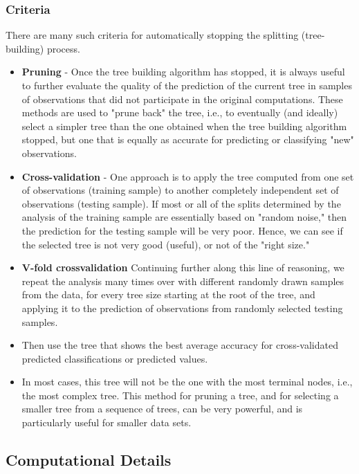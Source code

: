 \documentclass[caret-main.tex]{subfiles}
\begin{document}
\subsubsection*{Criteria}
There are many such criteria for automatically stopping the splitting (tree-building) process.
\begin{itemize}
\item \textbf{Pruning} - Once the tree building algorithm has stopped, it is always useful to further evaluate the quality of the prediction of the current tree in samples of observations that did not participate in the original computations. These methods are used to "prune back" the tree, i.e., to eventually (and ideally) select a simpler tree than the one obtained when the tree building algorithm stopped, but one that is equally as accurate for predicting or classifying "new" observations.
\item
\textbf{Cross-validation} -  One approach is to apply the tree computed from one set of observations (training sample) to another completely independent set of observations (testing sample). If most or all of the splits determined by the analysis of the training sample are essentially based on "random noise," then the prediction for the testing sample will be very poor. Hence, we can see if the selected tree is not very good (useful), or not of the "right size."

\item \textbf{V-fold crossvalidation} Continuing further along this line of reasoning, we repeat the analysis many times over with different randomly drawn samples from the data, for every tree size starting at the root of the tree, and applying it to the prediction of observations from randomly selected testing samples. 
\item Then use the tree that shows the best average accuracy for cross-validated predicted classifications or predicted values.
\item In most cases, this tree will not be the one with the most terminal nodes, i.e., the most complex tree. This method for pruning a tree, and for selecting a smaller tree from a sequence of trees, can be very powerful, and is particularly useful for smaller data sets. 
\end{itemize}
\newpage


\subsection{Computational Details}
\end{document}

